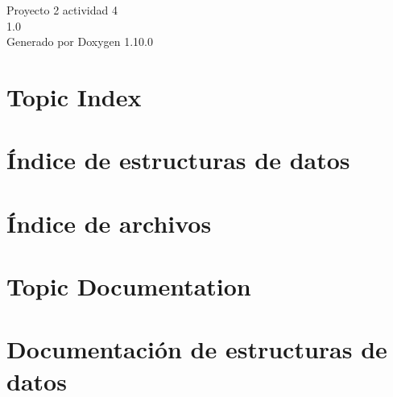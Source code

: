 \documentclass[twoside]{book}
\newcommand{\+}{\discretionary{\mbox{\scriptsize$\hookleftarrow$}}{}{}}
\newcommand{\clearemptydoublepage}{%
    \newpage{\pagestyle{empty}\cleardoublepage}%
  }
\begin{document}
  \raggedbottom
    \hypersetup{pageanchor=false,
                bookmarksnumbered=true,
                pdfencoding=unicode
               }
  \begin{titlepage}
  \vspace*{7cm}
  \begin{center}%
  {\Large Proyecto 2 actividad 4}\\
  [1ex]\large 1.\+0 \\
  \vspace*{1cm}
  {\large Generado por Doxygen 1.10.0}\\
  \end{center}
  \end{titlepage}
  \clearemptydoublepage
  \tableofcontents
  \clearemptydoublepage
  \hypersetup{pageanchor=true}


\chapter{Topic Index}

\chapter{Índice de estructuras de datos}

\chapter{Índice de archivos}

\chapter{Topic Documentation}

\chapter{Documentación de estructuras de datos}









\end{document}
